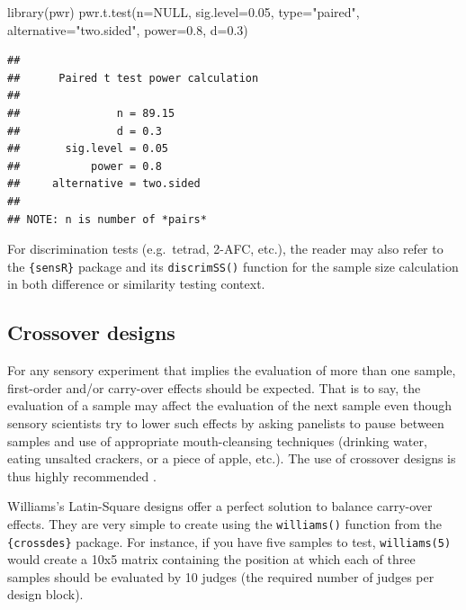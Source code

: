 \documentclass[
]{krantz}
\makeatletter
\newenvironment{Shaded}{\begin{snugshade}}{\end{snugshade}}
\newcommand{\AttributeTok}[1]{\textcolor[rgb]{0.61,0.61,0.61}{#1}}
\newcommand{\ConstantTok}[1]{\textcolor[rgb]{0,0,0}{#1}}
\newcommand{\FloatTok}[1]{\textcolor[rgb]{0.06,0.06,0.06}{#1}}
\newcommand{\FunctionTok}[1]{\textcolor[rgb]{0,0,0}{#1}}
\newcommand{\NormalTok}[1]{#1}
\newcommand{\StringTok}[1]{\textcolor[rgb]{0.5,0.5,0.5}{#1}}
\newenvironment{kframe}{%
\medskip{}
\setlength{\fboxsep}{.8em}
 \def\at@end@of@kframe{}%
 \ifinner\ifhmode%
  \def\at@end@of@kframe{\end{minipage}}%
  \begin{minipage}{\columnwidth}%
 \fi\fi%
 \def\FrameCommand##1{\hskip\@totalleftmargin \hskip-\fboxsep
 \colorbox{shadecolor}{##1}\hskip-\fboxsep
     \hskip-\linewidth \hskip-\@totalleftmargin \hskip\columnwidth}%
 \MakeFramed {\advance\hsize-\width
   \@totalleftmargin\z@ \linewidth\hsize
   \@setminipage}}%
 {\par\unskip\endMakeFramed%
 \at@end@of@kframe}
\renewenvironment{Shaded}{\begin{kframe}}{\end{kframe}}
\makeatother
\begin{document}
\begin{Shaded}
\begin{Highlighting}[]
\FunctionTok{library}\NormalTok{(pwr)}
\FunctionTok{pwr.t.test}\NormalTok{(}\AttributeTok{n=}\ConstantTok{NULL}\NormalTok{, }\AttributeTok{sig.level=}\FloatTok{0.05}\NormalTok{, }\AttributeTok{type=}\StringTok{"paired"}\NormalTok{, }
           \AttributeTok{alternative=}\StringTok{"two.sided"}\NormalTok{, }\AttributeTok{power=}\FloatTok{0.8}\NormalTok{, }\AttributeTok{d=}\FloatTok{0.3}\NormalTok{)}
\end{Highlighting}
\end{Shaded}

\begin{verbatim}
## 
##      Paired t test power calculation 
## 
##               n = 89.15
##               d = 0.3
##       sig.level = 0.05
##           power = 0.8
##     alternative = two.sided
## 
## NOTE: n is number of *pairs*
\end{verbatim}

For discrimination tests (e.g.~tetrad, 2-AFC, etc.), the reader may also refer to the \texttt{\{sensR\}} package and its \texttt{discrimSS()} function for the sample size calculation in both difference or similarity testing context.

\hypertarget{Crossover}{%
\subsection{Crossover designs}\label{Crossover}}

For any sensory experiment that implies the evaluation of more than one sample, first-order and/or carry-over effects should be expected. That is to say, the evaluation of a sample may affect the evaluation of the next sample even though sensory scientists try to lower such effects by asking panelists to pause between samples and use of appropriate mouth-cleansing techniques (drinking water, eating unsalted crackers, or a piece of apple, etc.). The use of crossover designs is thus highly recommended \citep{Macfie1989}.

Williams's Latin-Square designs offer a perfect solution to balance carry-over effects. They are very simple to create using the \texttt{williams()} function from the \texttt{\{crossdes\}} package. For instance, if you have five samples to test, \texttt{williams(5)} would create a 10x5 matrix containing the position at which each of three samples should be evaluated by 10 judges (the required number of judges per design block).
\end{document}

